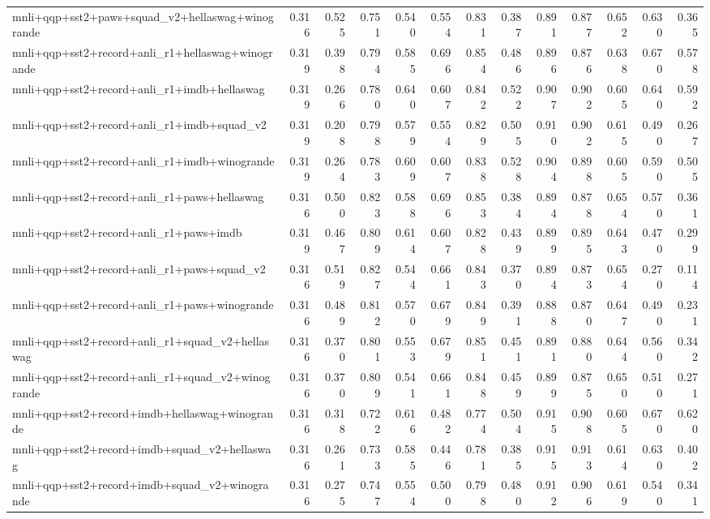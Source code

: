 \begin{table}[t]
\begin{tabular}{lrrrrrrrrrrrr}
    mnli+qqp+sst2+paws+squad\_v2+hellaswag+winogrande & 0.316 & 0.525 & 0.751 & 0.540 & 0.554 & 0.831 & 0.387 & 0.891 & 0.877 & 0.652 & 0.630 & 0.365 \\
    mnli+qqp+sst2+record+anli\_r1+hellaswag+winogrande & 0.319 & 0.398 & 0.794 & 0.585 & 0.696 & 0.854 & 0.486 & 0.896 & 0.876 & 0.638 & 0.670 & 0.578 \\
    mnli+qqp+sst2+record+anli\_r1+imdb+hellaswag & 0.319 & 0.266 & 0.780 & 0.640 & 0.607 & 0.842 & 0.522 & 0.907 & 0.902 & 0.605 & 0.640 & 0.592 \\
    mnli+qqp+sst2+record+anli\_r1+imdb+squad\_v2 & 0.319 & 0.208 & 0.798 & 0.579 & 0.554 & 0.829 & 0.505 & 0.910 & 0.902 & 0.615 & 0.490 & 0.267 \\
    mnli+qqp+sst2+record+anli\_r1+imdb+winogrande & 0.319 & 0.264 & 0.783 & 0.609 & 0.607 & 0.838 & 0.528 & 0.904 & 0.898 & 0.605 & 0.590 & 0.505 \\
    mnli+qqp+sst2+record+anli\_r1+paws+hellaswag & 0.316 & 0.500 & 0.823 & 0.588 & 0.696 & 0.853 & 0.384 & 0.894 & 0.878 & 0.654 & 0.570 & 0.361 \\
    mnli+qqp+sst2+record+anli\_r1+paws+imdb & 0.319 & 0.467 & 0.809 & 0.614 & 0.607 & 0.828 & 0.439 & 0.899 & 0.895 & 0.643 & 0.470 & 0.299 \\
    mnli+qqp+sst2+record+anli\_r1+paws+squad\_v2 & 0.316 & 0.519 & 0.827 & 0.544 & 0.661 & 0.843 & 0.370 & 0.894 & 0.873 & 0.654 & 0.270 & 0.114 \\
    mnli+qqp+sst2+record+anli\_r1+paws+winogrande & 0.316 & 0.489 & 0.812 & 0.570 & 0.679 & 0.849 & 0.391 & 0.888 & 0.870 & 0.647 & 0.490 & 0.231 \\
    mnli+qqp+sst2+record+anli\_r1+squad\_v2+hellaswag & 0.316 & 0.370 & 0.801 & 0.553 & 0.679 & 0.851 & 0.451 & 0.891 & 0.880 & 0.644 & 0.560 & 0.342 \\
    mnli+qqp+sst2+record+anli\_r1+squad\_v2+winogrande & 0.316 & 0.370 & 0.809 & 0.541 & 0.661 & 0.848 & 0.459 & 0.899 & 0.875 & 0.650 & 0.510 & 0.271 \\
    mnli+qqp+sst2+record+imdb+hellaswag+winogrande & 0.316 & 0.318 & 0.722 & 0.616 & 0.482 & 0.774 & 0.504 & 0.915 & 0.908 & 0.605 & 0.670 & 0.620 \\
    mnli+qqp+sst2+record+imdb+squad\_v2+hellaswag & 0.316 & 0.261 & 0.733 & 0.585 & 0.446 & 0.781 & 0.385 & 0.915 & 0.913 & 0.614 & 0.630 & 0.402 \\
    mnli+qqp+sst2+record+imdb+squad\_v2+winogrande & 0.316 & 0.275 & 0.747 & 0.554 & 0.500 & 0.798 & 0.480 & 0.912 & 0.906 & 0.619 & 0.540 & 0.341 \\

\end{tabular}
\end{table}
